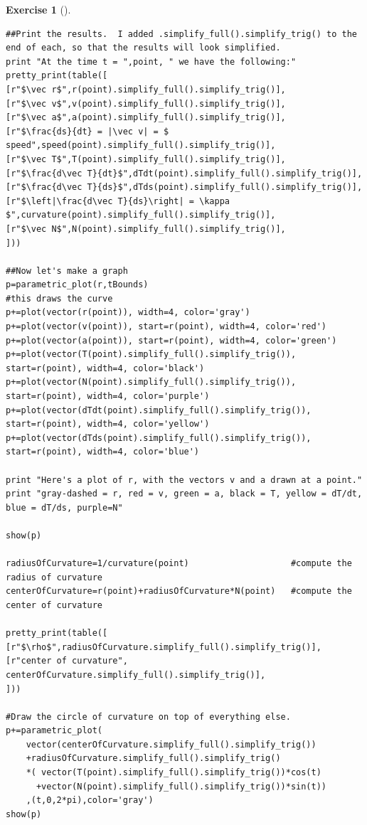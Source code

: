 \documentclass[10pt,]{book}
\theoremstyle{plain}
\theoremstyle{definition}
\theoremstyle{definition}
\theoremstyle{definition}
\theoremstyle{definition}
\newtheorem{exploration}[project]{Exercise}
\theoremstyle{definition}
\numberwithin{equation}{section}
\begin{document}
\begin{exploration}[]
\begin{enumerate}[font=\bfseries,label=(\alph*),ref=\alph*]
\begin{lstlisting}[style=sageinput]
##Print the results.  I added .simplify_full().simplify_trig() to the end of each, so that the results will look simplified.
print "At the time t = ",point, " we have the following:"
pretty_print(table([
[r"$\vec r$",r(point).simplify_full().simplify_trig()],
[r"$\vec v$",v(point).simplify_full().simplify_trig()],
[r"$\vec a$",a(point).simplify_full().simplify_trig()],
[r"$\frac{ds}{dt} = |\vec v| = $ speed",speed(point).simplify_full().simplify_trig()],
[r"$\vec T$",T(point).simplify_full().simplify_trig()],
[r"$\frac{d\vec T}{dt}$",dTdt(point).simplify_full().simplify_trig()],
[r"$\frac{d\vec T}{ds}$",dTds(point).simplify_full().simplify_trig()],
[r"$\left|\frac{d\vec T}{ds}\right| = \kappa $",curvature(point).simplify_full().simplify_trig()],
[r"$\vec N$",N(point).simplify_full().simplify_trig()],
]))

##Now let's make a graph
p=parametric_plot(r,tBounds)                                        #this draws the curve
p+=plot(vector(r(point)), width=4, color='gray')
p+=plot(vector(v(point)), start=r(point), width=4, color='red')
p+=plot(vector(a(point)), start=r(point), width=4, color='green')
p+=plot(vector(T(point).simplify_full().simplify_trig()), start=r(point), width=4, color='black')
p+=plot(vector(N(point).simplify_full().simplify_trig()), start=r(point), width=4, color='purple')
p+=plot(vector(dTdt(point).simplify_full().simplify_trig()), start=r(point), width=4, color='yellow')
p+=plot(vector(dTds(point).simplify_full().simplify_trig()), start=r(point), width=4, color='blue')

print "Here's a plot of r, with the vectors v and a drawn at a point."
print "gray-dashed = r, red = v, green = a, black = T, yellow = dT/dt, blue = dT/ds, purple=N"

show(p)

radiusOfCurvature=1/curvature(point)                    #compute the radius of curvature
centerOfCurvature=r(point)+radiusOfCurvature*N(point)   #compute the center of curvature

pretty_print(table([
[r"$\rho$",radiusOfCurvature.simplify_full().simplify_trig()],
[r"center of curvature", centerOfCurvature.simplify_full().simplify_trig()],
]))

#Draw the circle of curvature on top of everything else.
p+=parametric_plot(
    vector(centerOfCurvature.simplify_full().simplify_trig())
    +radiusOfCurvature.simplify_full().simplify_trig()
    *( vector(T(point).simplify_full().simplify_trig())*cos(t)
      +vector(N(point).simplify_full().simplify_trig())*sin(t))
    ,(t,0,2*pi),color='gray')
show(p)


\end{lstlisting}
\end{enumerate}
\end{exploration}
\end{document}
